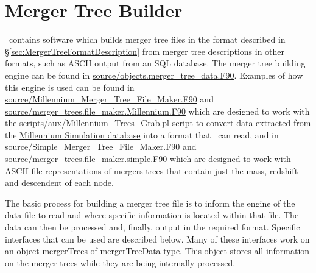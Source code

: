 \section{Merger Tree Builder}\label{sec:MergerTreeBuilder}

\glc\ contains software which builds merger tree files in the format described in \S\ref{sec:MergerTreeFormatDescription} from merger tree descriptions in other formats, such as ASCII output from an SQL database. The merger tree building engine can be found in \hyperlink{objects.merger_tree_data.F90}{{\normalfont \ttfamily source/objects.merger\_tree\_data.F90}}. Examples of how this engine is used can be found in \hyperlink{Millennium_Merger_Tree_File_Maker.F90}{{\normalfont \ttfamily source/Millennium\_Merger\_Tree\_File\_Maker.F90}} and \hyperlink{merger_trees.file_maker.Millennium.F90}{{\normalfont \ttfamily source/merger\_trees.file\_maker.Millennium.F90}} which are designed to work with the {\normalfont \ttfamily scripts/aux/Millennium\_Trees\_Grab.pl} script to convert data extracted from the \href{http://www.g-vo.org/MyMillennium3/}{Millennium Simulation database} into a format that \glc\ can read, and in \hyperlink{Simple_Merger_Tree_File_Maker.F90}{{\normalfont \ttfamily source/Simple\_Merger\_Tree\_File\_Maker.F90}} and \hyperlink{merger_trees.file_maker.simple.F90}{{\normalfont \ttfamily source/merger\_trees.file\_maker.simple.F90}} which are designed to work with ASCII file representations of mergers trees that contain just the mass, redshift and descendent of each node.

The basic process for building a merger tree file is to inform the engine of the data file to read and where specific information is located within that file. The data can then be processed and, finally, output in the required format. Specific interfaces that can be used are described below. Many of these interfaces work on an object {\normalfont \ttfamily mergerTrees} of {\normalfont \ttfamily mergerTreeData} type. This object stores all information on the merger trees while they are being internally processed.


